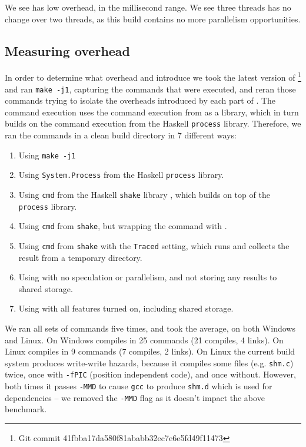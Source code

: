 We see \Rattle has low overhead, in the millisecond range. We see three threads has no change over two threads, as this build contains no more parallelism opportunities.

\subsection{Measuring overhead}

In order to determine what overhead \Rattle and \Fsatrace introduce we took the latest version of \Fsatrace\footnote{Git commit 41fbba17da580f81ababb32ec7e6e5fd49f11473} and ran \texttt{make -j1}, capturing the commands that were executed, and reran those commands trying to isolate the overheads introduced by each part of \Rattle. The \Rattle command execution uses the command execution from \Shake \cite{shake} as a library, which in turn builds on the command execution from the Haskell \texttt{process} library. Therefore, we ran the commands in a clean build directory in 7 different ways:

\begin{enumerate}
\item Using \texttt{make -j1}
\item Using \texttt{System.Process} from the Haskell \texttt{process} library.
\item Using \texttt{cmd} from the Haskell \texttt{shake} library \cite{shake}, which builds on top of the \texttt{process} library.
\item Using \texttt{cmd} from \texttt{shake}, but wrapping the command with \Fsatrace.
\item Using \texttt{cmd} from \texttt{shake} with the \texttt{Traced} setting, which runs \Fsatrace and collects the result from a temporary directory.
\item Using \Rattle with no speculation or parallelism, and not storing any results to shared storage.
\item Using \Rattle with all features turned on, including shared storage.
\end{enumerate}

We ran all sets of commands five times, and took the average, on both Windows and Linux. On Windows \Fsatrace compiles in 25 commands (21 compiles, 4 links). On Linux \Fsatrace compiles in 9 commands (7 compiles, 2 links). On Linux the current build system produces write-write hazards, because it compiles some files (e.g. \texttt{shm.c}) twice, once with \texttt{-fPIC} (position independent code), and once without. However, both times it passes \texttt{-MMD} to cause \texttt{gcc} to produce \texttt{shm.d} which is used for dependencies -- we removed the \texttt{-MMD} flag as it doesn't impact the above benchmark.

